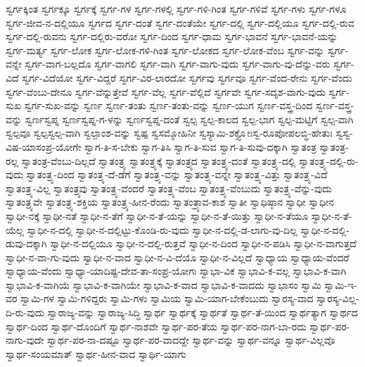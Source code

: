 {ಸ್ವರ್ಗಕ್ಕಿಂತ
ಸ್ವರ್ಗಕ್ಕೂ
ಸ್ವರ್ಗಕ್ಕೆ
ಸ್ವರ್ಗ-ಗಳ
ಸ್ವರ್ಗ-ಗಳಲ್ಲಿ
ಸ್ವರ್ಗ-ಗಳಿ-ಗಿಂತ
ಸ್ವರ್ಗ-ಗಳಿವೆ
ಸ್ವರ್ಗ-ಗಳು
ಸ್ವರ್ಗ-ಗಳೂ
ಸ್ವರ್ಗ-ಜೀವ-ನ-ದಲ್ಲಿಯೂ
ಸ್ವರ್ಗದ
ಸ್ವರ್ಗ-ದಂತೆ
ಸ್ವರ್ಗ-ದಂತೆಯೇ
ಸ್ವರ್ಗ-ದಲ್ಲಿ
ಸ್ವರ್ಗ-ದಲ್ಲಿಯೂ
ಸ್ವರ್ಗ-ದಲ್ಲಿ-ರುವ
ಸ್ವರ್ಗ-ದಲ್ಲಿ-ರುವನು
ಸ್ವರ್ಗ-ದಲ್ಲಿರು-ವರೋ
ಸ್ವರ್ಗ-ದಿಂದ
ಸ್ವರ್ಗ-ಧಾಮ
ಸ್ವರ್ಗ-ಭಾವನೆ
ಸ್ವರ್ಗ-ಭಾವನೆ-ಯನ್ನು
ಸ್ವರ್ಗ-ಮರ್ತ್ಯ
ಸ್ವರ್ಗ-ಲೋಕ
ಸ್ವರ್ಗ-ಲೋಕ-ಗಳಿ-ಗಿಂತ
ಸ್ವರ್ಗ-ಲೋಕದ
ಸ್ವರ್ಗ-ಲೋಕ-ವೆಂಬ
ಸ್ವರ್ಗ-ವನ್ನು
ಸ್ವರ್ಗ-ವನ್ನೇ
ಸ್ವರ್ಗ-ವಾಗ-ಬಲ್ಲದೊ
ಸ್ವರ್ಗ-ವಾಗಲಿ
ಸ್ವರ್ಗ-ವಾಗಿ
ಸ್ವರ್ಗ-ವಾಗು-ವುದು
ಸ್ವರ್ಗ-ವಾಗು-ವು-ದೆನ್ನು-ವರು
ಸ್ವರ್ಗ-ವಿದೆ
ಸ್ವರ್ಗ-ವಿದೆಯೋ
ಸ್ವರ್ಗ-ವಿದ್ದರೆ
ಸ್ವರ್ಗ-ವಿರ-ಲಾರದೋ
ಸ್ವರ್ಗವು
ಸ್ವರ್ಗವೂ
ಸ್ವರ್ಗ-ವೆಂದ-ರೇನು
ಸ್ವರ್ಗ-ವೆಂದು
ಸ್ವರ್ಗ-ವೆಂಬು-ದೇನೂ
ಸ್ವರ್ಗ-ವೆನ್ನುತ್ತೇವೆ
ಸ್ವರ್ಗ-ವೆಲ್ಲ
ಸ್ವರ್ಗ-ವೆಲ್ಲಿದೆ
ಸ್ವರ್ಗವೇ
ಸ್ವರ್ಗ-ಸದೃಶ-ವಾಗು-ವುದು
ಸ್ವರ್ಗ-ಸುಖ
ಸ್ವರ್ಗ-ಸುಖ-ವನ್ನು
ಸ್ವರ್ಣ
ಸ್ವರ್ಣ-ತಂತು
ಸ್ವರ್ಣ-ತಂತು-ವನ್ನು
ಸ್ವರ್ಣ-ಯುಗ
ಸ್ವರ್ಣ-ವಸ್ತ್ರ-ದಿಂದ
ಸ್ವರ್ಣ-ವಸ್ತ್ರ-ವನ್ನು
ಸ್ವರ್ಣಸ್ವಪ್ನ
ಸ್ವರ್ಣಸ್ವಪ್ನ-ಗ-ಳನ್ನು
ಸ್ವರ್ಣಸ್ವಪ್ನ-ದಂತೆ
ಸ್ವಲ್ಪ
ಸ್ವಲ್ಪ-ಕಾಲದ
ಸ್ವಲ್ಪ-ಭಾಗ
ಸ್ವಲ್ಪ-ಮಟ್ಟಿಗೆ
ಸ್ವಲ್ಪ-ವಾಗಿ
ಸ್ವಲ್ಪವೂ
ಸ್ವಲ್ಪಸ್ವಲ್ಪ-ವಾಗಿ
ಸ್ವಲ್ಪಾಂಶ-ವನ್ನು
ಸ್ವಷ್ಪ
ಸ್ವಸಮ್ಮೋಹಿನೀ
ಸ್ವಸ್ಯಾಮಿ-ಶಕ್ತ್ಯೋಃಸ್ವ-ರೂಪೋಪಲಬ್ಧಿ-ಹೇತುಃ
ಸ್ವಸ್ವ-ವಿಷ-ಯಾಸಂಪ್ರ-ಯೋಗೇ
ಸ್ವಾಗ-ತಿ-ಸ-ಬೇಕು
ಸ್ವಾಗ-ತಿಸಿ
ಸ್ವಾಗ-ತಿ-ಸುವ
ಸ್ವಾಗ-ತಿ-ಸುವು-ದಕ್ಕಾಗಿ
ಸ್ವಾತಂತ್ರ
ಸ್ವಾತಂತ್ರ-ರಲ್ಲ
ಸ್ವಾತಂತ್ರ-ವೆಂಬು-ದಿಲ್ಲದೆ
ಸ್ವಾತಂತ್ರ್ಯ
ಸ್ವಾತಂತ್ರ್ಯಕ್ಕೆ
ಸ್ವಾತಂತ್ರ್ಯದ
ಸ್ವಾತಂತ್ರ್ಯ-ದಂತೆ
ಸ್ವಾತಂತ್ರ್ಯ-ದಲ್ಲಿ
ಸ್ವಾತಂತ್ರ್ಯ-ದಲ್ಲಿ-ರು-ವುದು
ಸ್ವಾತಂತ್ರ್ಯ-ದಿಂದ
ಸ್ವಾತಂತ್ರ್ಯ-ದೆ-ಡೆಗೆ
ಸ್ವಾತಂತ್ರ್ಯ-ವನ್ನು
ಸ್ವಾತಂತ್ರ್ಯ-ವನ್ನೇ
ಸ್ವಾತಂತ್ರ್ಯ-ವಿತ್ತು
ಸ್ವಾತಂತ್ರ್ಯ-ವಿದೆ
ಸ್ವಾತಂತ್ರ್ಯ-ವಿಲ್ಲ
ಸ್ವಾತಂತ್ರ್ಯವು
ಸ್ವಾತಂತ್ರ್ಯ-ವೆಂದರೆ
ಸ್ವಾತಂತ್ರ್ಯ-ವೆಂಬ
ಸ್ವಾತಂತ್ರ್ಯ-ವೆಂಬುದು
ಸ್ವಾತಂತ್ರ್ಯ-ವೆನ್ನು-ವುದು
ಸ್ವಾತಂತ್ರ್ಯವೇ
ಸ್ವಾತಂತ್ರ್ಯ-ಶಕ್ತಿಯ
ಸ್ವಾತಂತ್ರ್ಯ-ಹೀನ-ರೆಂದು
ಸ್ವಾತಂತ್ರ್ಯಾವ-ಕಾಶ
ಸ್ವಾತೀ
ಸ್ವಾಧಿಷ್ಠಾನ
ಸ್ವಾಧೀ
ಸ್ವಾಧೀನ
ಸ್ವಾಧೀ-ನಕ್ಕೆ
ಸ್ವಾಧೀ-ನತೆ
ಸ್ವಾಧೀ-ನ-ತೆಗೆ
ಸ್ವಾಧೀ-ನ-ತೆ-ಯನ್ನು
ಸ್ವಾಧೀ-ನ-ತೆ-ಯಿತ್ತು
ಸ್ವಾಧೀ-ನ-ತೆಯೂ
ಸ್ವಾಧೀ-ನ-ತೆ-ಯೆಲ್ಲ
ಸ್ವಾಧೀ-ನ-ದಲ್ಲಿ
ಸ್ವಾಧೀ-ನ-ದಲ್ಲಿಟ್ಟು-ಕೊಂಡಿ-ರು-ವುದು
ಸ್ವಾಧೀ-ನ-ದಲ್ಲಿ-ಡ-ಲಾಗು-ವು-ದಿಲ್ಲ
ಸ್ವಾಧೀ-ನ-ದಲ್ಲಿ-ಡುವು-ದಕ್ಕಾಗಿ
ಸ್ವಾಧೀ-ನ-ದಲ್ಲಿಯೂ
ಸ್ವಾಧೀ-ನ-ದಲ್ಲಿ-ರುತ್ತವೆ
ಸ್ವಾಧೀ-ನ-ದಿಂದ
ಸ್ವಾಧೀ-ನ-ಪಡಿಸಿ
ಸ್ವಾಧೀ-ನ-ವಾಗುತ್ತದೆ
ಸ್ವಾಧೀ-ನ-ವಾ-ಗು-ವುದು
ಸ್ವಾಧೀ-ನ-ವಾದ
ಸ್ವಾಧೀ-ನ-ವಿ-ದೆಯೊ
ಸ್ವಾಧೀ-ನ-ವಿಲ್ಲದೆ
ಸ್ವಾಧ್ಯಾಯ
ಸ್ವಾಧ್ಯಾಯ-ವೆಂದರೆ
ಸ್ವಾಧ್ಯಾಯ-ವೆಂದು
ಸ್ವಾಧ್ಯಾ-ಯಾದಿಷ್ಟ-ದೇವ-ತಾ-ಸಂಪ್ರ-ಯೋಗಃ
ಸ್ವಾಭಾ-ವಿಕ
ಸ್ವಾಭಾವಿ-ಕ-ವಲ್ಲ
ಸ್ವಾಭಾವಿ-ಕ-ವಾಗಿ
ಸ್ವಾಭಾವಿ-ಕ-ವಾಗಿಯೆ
ಸ್ವಾಭಾವಿ-ಕ-ವಾಗಿಯೇ
ಸ್ವಾಭಾವಿ-ಕ-ವಾದ
ಸ್ವಾಭಾವಿ-ಕ-ವಾದದು
ಸ್ವಾಭಾಸಂ
ಸ್ವಾಮಿ
ಸ್ವಾಮಿ-ಇ-ವರ
ಸ್ವಾಮಿ-ಗಳ
ಸ್ವಾಮಿ-ಗಳಿದ್ದರು
ಸ್ವಾಮಿ-ಗಳು
ಸ್ವಾಮಿಯ
ಸ್ವಾಮಿ-ಯಾಗ-ಬೇಕೆಂಬುದು
ಸ್ವಾರಸ್ಯ-ವಾದ
ಸ್ವಾರಸ್ಯ-ವಿಲ್ಲ-ದಿ-ರು-ವುದು
ಸ್ವಾರಾಜ್ಯ-ವನ್ನು
ಸ್ವಾರಾಜ್ಯ-ಸಿದ್ಧಿ
ಸ್ವಾರ್ಥ
ಸ್ವಾರ್ಥಕ್ಕೆ
ಸ್ವಾರ್ಥತೆ
ಸ್ವಾರ್ಥ-ತೆ-ಯಿಂದ
ಸ್ವಾರ್ಥತ್ಯಾಗ
ಸ್ವಾರ್ಥದ
ಸ್ವಾರ್ಥ-ದಿಂದ
ಸ್ವಾರ್ಥ-ದೊಂದಿಗೆ
ಸ್ವಾರ್ಥ-ನಾಶವೇ
ಸ್ವಾರ್ಥ-ಪರ-ತೆಯ
ಸ್ವಾರ್ಥ-ಪರ-ನಾಗ-ಬಾ-ರದು
ಸ್ವಾರ್ಥ-ಪರ-ನಾಗು-ವುದೇ
ಸ್ವಾರ್ಥ-ಪರ-ನಾ-ದಷ್ಟೂ
ಸ್ವಾರ್ಥ-ಪರ-ವಾದದ್ದೇ
ಸ್ವಾರ್ಥ-ವನ್ನು
ಸ್ವಾರ್ಥ-ವನ್ನೂ
ಸ್ವಾರ್ಥ-ವಿಲ್ಲವೊ
ಸ್ವಾರ್ಥ-ಸಂಯಮಾತ್
ಸ್ವಾರ್ಥ-ಹೀನ-ವಾದ
ಸ್ವಾರ್ಥಿ-ಯಾಗು
}
